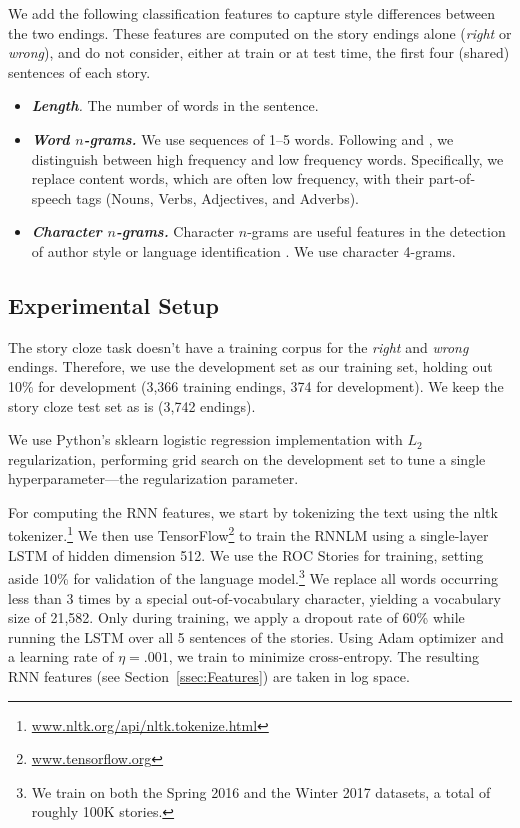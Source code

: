 \documentclass[a4paper,11pt]{article}
\newcommand{\secref}[1]{Section~\ref{ssec:#1}}
\begin{document}
We add the following classification features to capture style differences between the two endings. 
These features are computed on the story endings alone ({\it right} or {\it wrong}), and do not consider, either at train or at test time, the first four (shared) sentences of each story.
\begin{itemize}
\item\textit{\textbf{Length}.} The number of words in the sentence.
\item\textit{\textbf{Word $n$-grams.}} We use sequences of 1--5
  words. Following  and , we distinguish between high frequency and low frequency words. 
Specifically, we replace content words, which are often low frequency, with their part-of-speech tags (Nouns, Verbs, Adjectives, and Adverbs).
\item\textit{\textbf{Character $n$-grams.}} Character $n$-grams are useful features in the detection of author style \cite{Stamatatos:2009} or language identification \cite{lui2011cross}.
We use character 4-grams.
\end{itemize}



\subsection{Experimental Setup}
The story cloze task doesn't have a training corpus for the {\it right} and {\it wrong} endings.
Therefore, we use the development set as our training set, holding out 10\% for development
(3,366 training endings, 374 for development). We keep the story cloze test set as is (3,742 endings).

We use  Python's sklearn logistic regression implementation with $L_2$
regularization, performing grid search on the development set to
tune a single hyperparameter---the regularization parameter.  

For computing the RNN features, we start by tokenizing the text using the nltk tokenizer.\footnote{\url{www.nltk.org/api/nltk.tokenize.html}} 
We then use TensorFlow\footnote{\url{www.tensorflow.org}} to train the RNNLM using a single-layer LSTM of hidden dimension 512.
We use the ROC Stories for training, setting aside 10\% for validation of the language model.\footnote{We train on both the Spring 2016 and the Winter 2017 datasets, a total of roughly 100K stories.}
We replace all words occurring less than 3 times by a special out-of-vocabulary character, yielding a vocabulary size of 21,582.
Only during training, we apply a dropout rate of 60\% while running the LSTM over all 5 sentences of the stories. 
Using Adam optimizer \cite{kingma2014adam} and a learning rate of
$\eta=.001$, we train to minimize cross-entropy.
The resulting RNN features (see \secref{Features}) are taken in log space.
\end{document}
